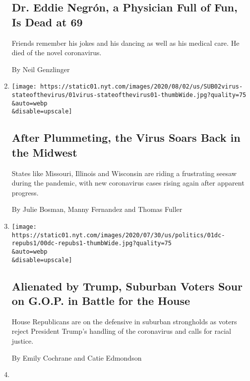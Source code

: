 \begin{enumerate}
{  \subsection{Dr. Eddie Negrón, a Physician Full of Fun, Is Dead at
  69}\label{dr-eddie-negruxf3n-a-physician-full-of-fun-is-dead-at-69}}

  Friends remember his jokes and his dancing as well as his medical
  care. He died of the novel coronavirus.

  By Neil Genzlinger
\item
  \href{/2020/08/01/us/coronavirus-midwest-cases-deaths.html}{}

  \texttt{[image: https://static01.nyt.com/images/2020/08/02/us/SUB02virus-stateofthevirus/01virus-stateofthevirus01-thumbWide.jpg?quality=75\\\&auto=webp\\\&disable=upscale]}

  \hypertarget{after-plummeting-the-virus-soars-back-in-the-midwest-1}{%
  \subsection{After Plummeting, the Virus Soars Back in the
  Midwest}\label{after-plummeting-the-virus-soars-back-in-the-midwest-1}}

  States like Missouri, Illinois and Wisconsin are riding a frustrating
  seesaw during the pandemic, with new coronavirus cases rising again
  after apparent progress.

  By Julie Bosman, Manny Fernandez and Thomas Fuller
\item
  \href{/2020/08/01/us/politics/trump-suburban-voters-republicans-house.html}{}

  \texttt{[image: https://static01.nyt.com/images/2020/07/30/us/politics/01dc-repubs1/00dc-repubs1-thumbWide.jpg?quality=75\\\&auto=webp\\\&disable=upscale]}

  \hypertarget{alienated-by-trump-suburban-voters-sour-on-gop-in-battle-for-the-house}{%
  \subsection{Alienated by Trump, Suburban Voters Sour on G.O.P. in
  Battle for the
  House}\label{alienated-by-trump-suburban-voters-sour-on-gop-in-battle-for-the-house}}

  House Republicans are on the defensive in suburban strongholds as
  voters reject President Trump's handling of the coronavirus and calls
  for racial justice.

  By Emily Cochrane and Catie Edmondson
\item
  \href{/2020/08/01/us/robert-gnaizda-dead.html}{}


\end{enumerate}
